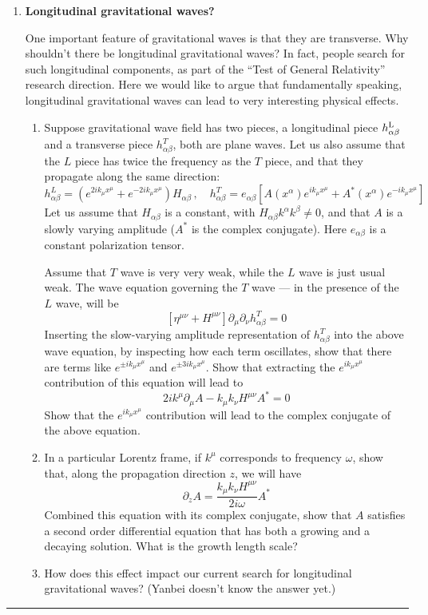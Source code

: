 \documentclass[12pt,twoside]{article}
\begin{document}
\begin{enumerate}
\item  {\bf Longitudinal gravitational waves?} 

One important feature of gravitational waves is that they are transverse.  Why shouldn't there be longitudinal gravitational waves?  In fact, people search for such longitudinal components, as part of the ``Test of General Relativity'' research direction.  Here we would like to argue that fundamentally speaking, longitudinal gravitational waves can lead to very interesting physical effects. 

\begin{enumerate}
\item 
Suppose gravitational wave field has two pieces, a longitudinal piece $h_{\alpha\beta}^{\rm L}$ and a transverse piece $h_{\alpha\beta}^T$, both are plane waves.  Let us also assume that the $L$ piece has twice the frequency as the $T$ piece, and that they propagate along the same direction: 
\begin{equation}
h_{\alpha\beta}^L = \left( e^{2ik_\mu x^\mu} + e^{-2ik_\mu x^\mu}\right)H_{\alpha\beta}\,,\quad
h_{\alpha\beta}^T =  e_{\alpha\beta} \left[A(x^\alpha) e^{i k_\mu x^\mu}+A^*(x^\alpha) e^{-i k_\mu x^\mu}\right]
\end{equation}
Let us assume that $H_{\alpha\beta}$ is a constant, with $H_{\alpha\beta}k^\alpha k^\beta\neq 0$, and that $A$ is a slowly varying amplitude ($A^*$ is the complex conjugate). Here $e_{\alpha\beta}$ is a constant polarization tensor. 

Assume that $T$ wave is very very weak, while the $L$ wave is just usual weak.  The wave equation governing the $T$ wave --- in the presence of the $L$ wave, will be
\begin{equation}
\left[\eta^{\mu\nu}+ H^{\mu\nu}\right]\partial_\mu\partial_\nu h_{\alpha\beta}^T  =0
\end{equation}
Inserting the slow-varying amplitude representation of $h^T_{\alpha\beta}$ into the above wave equation, by inspecting how each term oscillates, show that there are terms like $e^{\pm ik_\mu x^\mu}$ and $e^{\pm 3 ik_\mu x^\mu}$. Show that extracting the $e^{i k_\mu x^\mu}$ contribution of this equation will lead to
\begin{equation}
2ik^\mu \partial_\mu A - k_\mu k_\nu H^{\mu\nu} A^*=0
\end{equation}
Show that the $e^{i k_\mu x^\mu}$ contribution will lead to the complex conjugate of the above equation. 
\item In a particular Lorentz frame, if $k^\mu$ corresponds to frequency $\omega$, show that, along the propagation direction $z$, we will have
\begin{equation}
\partial_z A = \frac{k_\mu k_\nu H^{\mu\nu} }{2i\omega}A^*
\end{equation}
Combined this equation with its complex conjugate, show that $A$ satisfies a second order differential equation that has both a growing and a decaying solution.   What is the growth length scale? 
\item How does this effect impact our current search for longitudinal gravitational waves?  (Yanbei doesn't know the  answer yet.)
\end{enumerate}
\end{enumerate}
\bigskip
{\color{awesome} \hrule}
\end{document}
